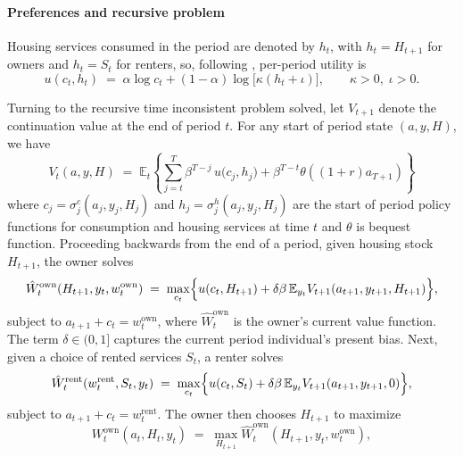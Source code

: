 \documentclass[12pt]{article}
\begin{document}
\paragraph{Preferences and recursive problem} 
%
Housing services consumed in the period are denoted by $h_{t}$, with $h_{t}=H_{t+1}$ for owners and $h_{t}=S_{t}$ for renters, so, following \cite{Fella2014}, per-period utility is
%
\begin{equation}\label{eq:period_u}
u(c_{t},h_{t}) \;=\;
    \alpha\log c_{t} + (1-\alpha)\log\!\bigl[\kappa(h_{t}+\iota)\bigr],
    \qquad \kappa>0,\; \iota>0.
\end{equation}

Turning to the recursive time inconsistent problem solved, let $V_{t+1}$ denote the continuation value at the end of period $t$. For any start of period state $(a,y,H)$, we have
%
\begin{equation}\label{eq:continuation_value}
V_{t}(a,y,H)\;=\;
  \mathbb{E}_{t}\left\{\!\sum_{j=t}^{T}\beta^{T-j}\,
  u\!\bigl(c_{j},h_{j}\bigr) + \beta^{T-t}\theta((1+r)a_{T+1})\right\}
\end{equation}
%
where $c_{j}=\sigma^{c}_{j}(a_{j},y_{j},H_{j})$ and
$h_{j}=\sigma^{h}_{j}(a_{j},y_{j},H_{j})$ are the start of period policy functions for
consumption and housing services at time $t$ and $\theta$ is bequest function.  Proceeding backwards from the end of a period, given housing stock $H_{t+1}$, the owner solves
%
\begin{equation}\label{eq:Bellman_owner_cond}
\hat{W}_{t}^{\text{own}}(H_{t+1},y_{t},w_{t}^{\text{own}})
  \;=\;
  \max_{c_{t}}
  \Bigl\{
    u(c_{t},H_{t+1})
    +\delta\beta\,
     \mathbb{E}_{y_{t}}V_{t+1}(a_{t+1},y_{t+1},H_{t+1})
  \Bigr\},
\end{equation}
subject to $a_{t+1}+c_{t}=w_{t}^{\text{own}}$, where $\hat{W}_{t}^{\text{own}}$ is the owner's current value function. The term $\delta\in (0,1]$ captures the current period individual's present bias. Next, given a choice of rented services $S_{t}$, a renter solves
%
\begin{equation}\label{eq:Bellman_renter_cond}
\hat{W}_{t}^{\text{rent}}(w_{t}^{\text{rent}},S_{t},y_{t})
  \;=\;
  \max_{c_{t}}
  \Bigl\{
    u(c_{t},S_{t})
    +\delta\beta\,
     \mathbb{E}_{y_{t}}V_{t+1}(a_{t+1},y_{t+1},0)
  \Bigr\},
\end{equation}
%
subject to $a_{t+1}+c_{t}=w_{t}^{\text{rent}}$. The owner then chooses $H_{t+1}$ to maximize
%
\begin{equation}\label{eq:Bellman_owner}
W_{t}^{\text{own}}(a_{t},H_{t},y_{t})
  \;=\;
  \max_{H_{t+1}}
    \hat{W}_{t}^{\text{own}}(H_{t+1},y_{t},w_{t}^{\text{own}}),
\end{equation}
\end{document}
